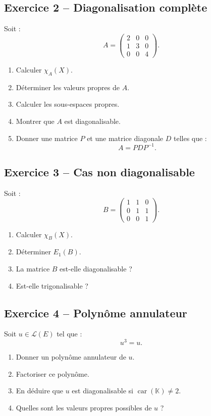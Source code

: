 \documentclass[11pt,a4paper]{article}
\newcommand{\K}{\mathbb K}
\newcommand{\Lcal}{\mathcal L}
\begin{document}
\subsection*{Exercice 2 -- Diagonalisation complète}

Soit :
\[
A=
\begin{pmatrix}
2&0&0\\
1&3&0\\
0&0&4
\end{pmatrix}.
\]

\begin{enumerate}
    \item Calculer \(\chi_A(X)\).
    \item Déterminer les valeurs propres de \(A\).
    \item Calculer les sous-espaces propres.
    \item Montrer que \(A\) est diagonalisable.
    \item Donner une matrice \(P\) et une matrice diagonale \(D\) telles que :
    \[
    A=PDP^{-1}.
    \]
\end{enumerate}

\subsection*{Exercice 3 -- Cas non diagonalisable}

Soit :
\[
B=
\begin{pmatrix}
1&1&0\\
0&1&1\\
0&0&1
\end{pmatrix}.
\]

\begin{enumerate}
    \item Calculer \(\chi_B(X)\).
    \item Déterminer \(E_1(B)\).
    \item La matrice \(B\) est-elle diagonalisable ?
    \item Est-elle trigonalisable ?
\end{enumerate}

\subsection*{Exercice 4 -- Polynôme annulateur}

Soit \(u\in\Lcal(E)\) tel que :
\[
u^3=u.
\]

\begin{enumerate}
    \item Donner un polynôme annulateur de \(u\).
    \item Factoriser ce polynôme.
    \item En déduire que \(u\) est diagonalisable si \(\operatorname{car}(\K)\neq2\).
    \item Quelles sont les valeurs propres possibles de \(u\) ?
\end{enumerate}
\end{document}
